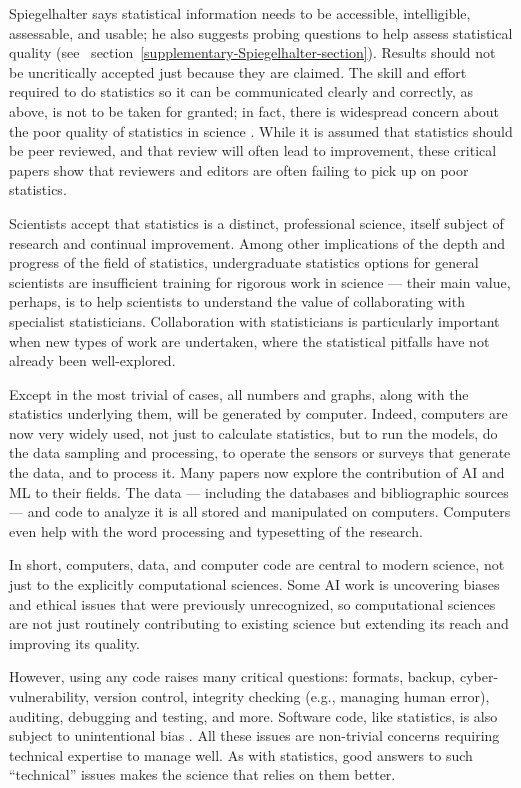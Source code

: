 \documentclass{comjnl}
\begin{document}
Spiegelhalter \cite{Spiegelhalter} says statistical information needs to be accessible, intelligible, assessable, and usable; he also suggests probing questions to help assess statistical quality (see \supplement\ section~\ref{supplementary-Spiegelhalter-section}). Results should not be uncritically accepted just because they are claimed. The skill and effort required to do statistics so it can be communicated clearly and correctly, as above, is not to be taken for granted; in fact, there is widespread concern about the poor quality of statistics in science \cite{paul-hci,pnas-stats}. While it is assumed that statistics should be peer reviewed, and that review will often lead to improvement, these critical papers show that reviewers and editors are often failing to pick up on poor statistics.

Scientists accept that statistics is a distinct, professional science, itself subject of research and continual improvement. Among other implications of the depth and progress of the field of statistics, undergraduate statistics options for general scientists are insufficient training for rigorous work in science --- their main value, perhaps, is to help scientists to understand the value of collaborating with specialist statisticians. Collaboration with statisticians is particularly important when new types of work are undertaken, where the statistical pitfalls have not already been well-explored.

Except in the most trivial of cases, all numbers and graphs, along with the statistics underlying them, will be generated by computer. Indeed, computers are now very widely used, not just to calculate statistics, but to run the models, do the data sampling and processing, to operate the sensors or surveys that generate the data, and to process it. Many papers now explore the contribution of AI and ML to their fields. The data --- including the databases and bibliographic sources --- and code to analyze it is all stored and manipulated on computers. Computers even help with the word processing and typesetting of the research.

In short, computers, data, and computer code are central to modern science, not just to the explicitly computational sciences. Some AI work is uncovering biases and ethical issues that were previously unrecognized, so computational sciences are not just routinely contributing to existing science but extending its reach and improving its quality.

However, using any code raises many critical questions: formats, backup, cyber-vulnerability, version control, integrity checking (e.g., managing human error), auditing, debugging and testing, and more.  Software code, like statistics, is also subject to unintentional bias \cite{Ben,se-bias}.  All these issues are non-trivial concerns requiring technical expertise to manage well. As with statistics, good answers to such ``technical'' issues makes the science that relies on them better.
\end{document}

